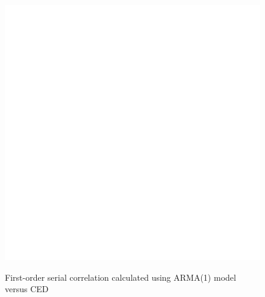\documentclass[12pt]{article}
\begin{document}
\begin{figure}
  \caption{First-order serial correlation calculated using ARMA(1) model versus CED}
  \includegraphics[width = 1\textwidth]{../results/SerCol-CED5yr3monARMA11}
  \label{fig:SerCol-CED5yr3monARMA1}
\end{figure}

\clearpage



\end{document}
